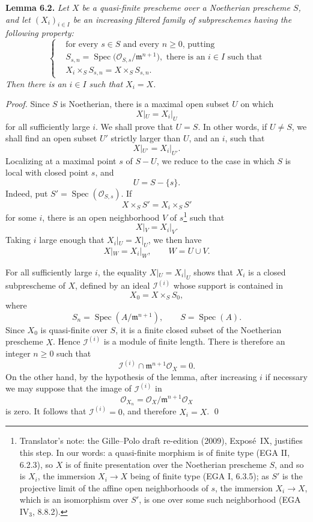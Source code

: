 \medskip
\noindent{}\textbf{Lemma 6.2.}
\textit{Let \(X\) be a quasi-finite prescheme over a Noetherian
prescheme \(S\), and let \((X_i)_{i\in I}\) be an increasing filtered
family of subpreschemes having the following property:
\[
\left\{
\begin{aligned}
 &\text{for every \(s\in S\) and every \(n\geq0\), putting}\\
 &S_{s,n}
   =\operatorname{Spec}
      \bigl(\mathscr O_{S,s}/\mathfrak m^{n+1}\bigr),
   \text{ there is an \(i\in I\) such that}\\
 &X_i\times_S S_{s,n}=X\times_S S_{s,n}.
\end{aligned}
\right.
\]
Then there is an \(i\in I\) such that \(X_i=X\).}

\emph{Proof.}
Since \(S\) is Noetherian, there is a maximal open subset \(U\) on which
\[
  X|_U=X_i|_U
\]
for all sufficiently large \(i\). We shall prove that \(U=S\). In other
words, if \(U\neq S\), we shall find an open subset \(U'\) strictly
larger than \(U\), and an \(i\), such that
\[
  X|_{U'}=X_i|_{U'}.
\]
Localizing at a maximal point \(s\) of \(S-U\), we reduce to the case in
which \(S\) is local with closed point \(s\), and
\[
  U=S-\{s\}.
\]
Indeed, put \(S'=\operatorname{Spec}(\mathscr O_{S,s})\). If
\[
  X\times_S S'=X_i\times_S S'
\]
for some \(i\),
there is an open neighborhood \(V\) of \(s\)\footnote{Translator's note: the
Gille--Polo draft re-edition (2009), Expos\'e~IX, justifies this step. In our
words: a quasi-finite morphism is of finite type (EGA II, 6.2.3), so \(X\) is
of finite presentation over the Noetherian prescheme \(S\), and so is
\(X_i\), the immersion \(X_i\to X\) being of finite type (EGA I, 6.3.5); as
\(S'\) is the projective limit of the affine open neighborhoods of \(s\), the
immersion \(X_i\to X\), which is an isomorphism over \(S'\), is one over
some such neighborhood (EGA IV\(_3\), 8.8.2).} such that
\[
  X|_V=X_i|_V.
\]
Taking \(i\) large enough that \(X_i|_U=X|_U\), we then have
\[
  X|_W=X_i|_W,
  \qquad W=U\cup V.
\]

For all sufficiently large \(i\), the equality \(X|_U=X_i|_U\) shows
that \(X_i\) is a closed subprescheme of \(X\), defined by an ideal
\(\mathscr I^{(i)}\) whose support is contained in
\[
  X_0=X\times_S S_0,
\]
where
\[
  S_n=\operatorname{Spec}(A/\mathfrak m^{n+1}),
  \qquad S=\operatorname{Spec}(A).
\]
Since \(X_0\) is quasi-finite over \(S\), it is a finite closed subset
of the Noetherian prescheme \(X\). Hence \(\mathscr I^{(i)}\) is a
module of finite length. There is therefore an integer \(n\geq0\) such
that
\[
  \mathscr I^{(i)}
  \cap\mathfrak m^{n+1}\mathscr O_X=0.
\]
On the other hand, by the hypothesis of the lemma, after increasing
\(i\) if necessary we may suppose that the image of
\(\mathscr I^{(i)}\) in
\[
  \mathscr O_{X_n}
  =\mathscr O_X/\mathfrak m^{n+1}\mathscr O_X
\]
is zero. It follows that \(\mathscr I^{(i)}=0\), and therefore
\(X_i=X\). \qed

